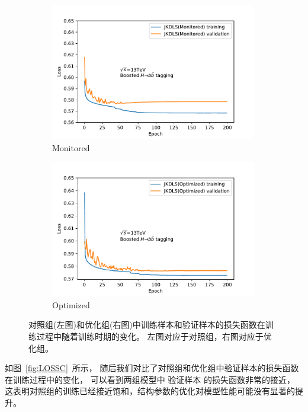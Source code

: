 \begin{figure}[htbp]
  \begin{subfigure}{.5\textwidth}
  \centering
   \includegraphics[width=0.99\textwidth]{figuresXbb/LossMON.pdf}
   \caption{Monitored}
  \end{subfigure}
  \begin{subfigure}{.5\textwidth}
  \centering
   \includegraphics[width=0.99\textwidth]{figuresXbb/LossOPT.pdf}
   \caption{Optimized}
  \end{subfigure}
  \caption{
 对照组(左图)和优化组(右图)中训练样本和验证样本的损失函数在训练过程中随着训练时期的变化。
 左图对应于对照组，右图对应于优化组。
  }
  \label{fig:LOSS}
\end{figure} 

如图~\ref{fig:LOSSC}~所示，
随后我们对比了对照组和优化组中验证样本的损失函数在训练过程中的变化，
可以看到两组模型中
验证样本
的损失函数非常的接近，
这表明对照组的训练已经接近饱和，结构参数的优化对模型性能可能没有显著的提升。

